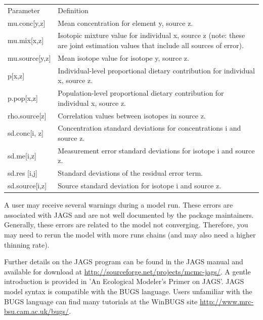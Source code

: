 \documentclass{article}
\begin{document}
\begin{center}
\begin{tabular}{ll}
Parameter & Definition \\
mu.conc[y,z] & Mean concentration for element y, source z.\\
mu.mix[x,z] & Isotopic mixture value for individual x, source z (note: these are joint estimation values that include all sources of error).\\
mu.source[y,z] & Mean isotope value for isotope y, source z.\\
p[x,z] & Individual-level proportional dietary contribution for individual x, source z.\\
p.pop[x,z] & Population-level proportional dietary contribution for individual x, source z.\\
rho.source[z] & Correlation values between isotopes in source z.\\
sd.conc[i, z] & Concentration standard deviations for concentrations i and source z.\\
sd.me[i,z] & Measurement error standard deviations for isotope i and source z.\\
sd.res [i,j] & Standard deviations of the residual error term.\\
sd.source[i,z] & Source standard deviation for isotope i and source z.
\end{tabular}
\end{center}

A user may receive several warnings during a model run. These errors are associated with JAGS and are not well documented by the package maintainers. Generally, these errors are related to the model not converging. Therefore, you may need to rerun the model with more runs chains (and may also need a higher thinning rate).

Further details on the JAGS program can be found in the JAGS manual and available for download at \url{http://sourceforge.net/projects/mcmc-jags/}. A gentle introduction is provided in 'An Ecological Modeler's Primer on JAGS'. JAGS model syntax is compatible with the BUGS language. Users unfamiliar with the BUGS language can find many tutorials at the WinBUGS site \url{http://www.mrc-bsu.cam.ac.uk/bugs/}.
\end{document}
